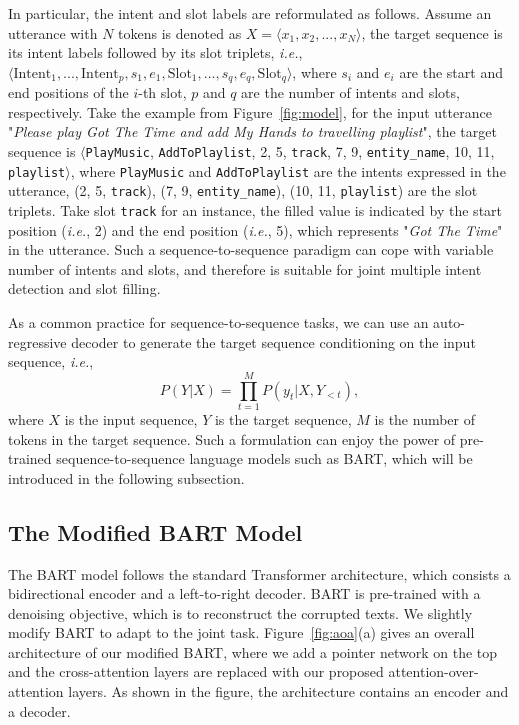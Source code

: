 \documentclass[11pt]{article}
\begin{document}
In particular, the intent and slot labels are reformulated as follows. Assume an utterance with $N$ tokens is denoted as $X = \langle x_1, x_2, ..., x_N\rangle$, the target sequence is its intent labels followed by its slot triplets, \emph{i.e.}, $\langle\text{Intent}_1, ..., \text{Intent}_p, s_1, e_1, \text{Slot}_1, ..., s_q, e_q, \text{Slot}_q\rangle$, where $s_i$ and $e_i$ are the start and end positions of the $i$-th slot, $p$ and $q$ are the number of intents and slots, respectively. Take the example from Figure~\ref{fig:model}, for the input utterance "\textit{Please play Got The Time and add My Hands to travelling playlist}", the target sequence is $\langle$\texttt{PlayMusic}, \texttt{AddToPlaylist}, 2, 5, \texttt{track}, 7, 9, \texttt{entity\_name}, 10, 11, \texttt{playlist}$\rangle$, where \texttt{PlayMusic} and \texttt{AddToPlaylist} are the intents expressed in the utterance, (2, 5, \texttt{track}), (7, 9, \texttt{entity\_name}), (10, 11, \texttt{playlist}) are the slot triplets. Take slot \texttt{track} for an instance, the filled value is indicated by the start position (\emph{i.e.}, 2) and the end position (\emph{i.e.}, 5), which represents "\textit{Got The Time}" in the utterance. Such a sequence-to-sequence paradigm can cope with variable number of intents and slots, and therefore is suitable for joint multiple intent detection and slot filling.

As a common practice for sequence-to-sequence tasks, we can use an auto-regressive decoder to generate the target sequence conditioning on the input sequence, \emph{i.e.},
\begin{equation}
    P(Y|X) = \prod_{t=1}^{M}P(y_t|X,Y_{<t}),
\end{equation}
where $X$ is the input sequence, $Y$ is the target sequence, $M$ is the number of tokens in the target sequence. Such a formulation can enjoy the power of pre-trained sequence-to-sequence language models such as BART\cite{DBLP:conf/acl/LewisLGGMLSZ20}, which will be introduced in the following subsection.

\subsection{The Modified BART Model}
\label{subsec:bart}
The BART model\cite{DBLP:conf/acl/LewisLGGMLSZ20} follows the standard Transformer architecture\cite{DBLP:conf/nips/VaswaniSPUJGKP17}, which consists a bidirectional encoder and a left-to-right decoder. BART is pre-trained with a denoising objective, which is to reconstruct the corrupted texts. We slightly modify BART to adapt to the joint task. Figure~\ref{fig:aoa}(a) gives an overall architecture of our modified BART, where we add a pointer network on the top and the cross-attention layers are replaced with our proposed attention-over-attention layers. As shown in the figure, the architecture contains an encoder and a decoder.
\end{document}

